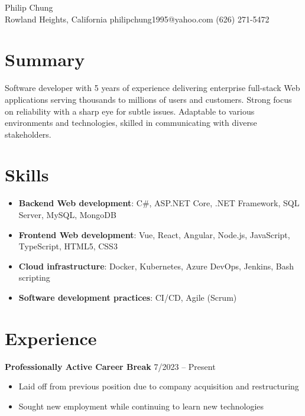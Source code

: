 \documentclass[12pt]{article}
\newcommand{\titleheader}[2]{\textbf{#1} \hfill #2}
\begin{document}
	\begin{center}
		{\headerfont\fontsize{24pt}{24pt}\selectfont Philip Chung} \\ \vspace{0.5em}
		Rowland Heights, California  philipchung1995@yahoo.com  (626) 271-5472
	\end{center}

	\section*{Summary}

	Software developer with 5 years of experience delivering enterprise full-stack Web applications serving thousands to millions of users and customers. Strong focus on reliability with a sharp eye for subtle issues. Adaptable to various environments and technologies, skilled in communicating with diverse stakeholders.

	\section*{Skills}

	\newcommand{\skillitem}[2]{\item \textbf{#1}: #2}

	\begin{itemize}[left=0.25in .. 0.25in,label={},itemindent=-0.25in]
		\skillitem{Backend Web development}{C\#, ASP.NET Core, .NET Framework, SQL Server, MySQL, MongoDB}
		\skillitem{Frontend Web development}{Vue, React, Angular, Node.js, JavaScript, TypeScript, HTML5, CSS3}
		\skillitem{Cloud infrastructure}{Docker, Kubernetes, Azure DevOps, Jenkins, Bash scripting}
		\skillitem{Software development practices}{CI/CD, Agile (Scrum)}
	\end{itemize}

	\section*{Experience}

	\titleheader{Professionally Active Career Break}{7/2023 -- Present}

	\begin{itemize}
		\item Laid off from previous position due to company acquisition and restructuring
		\item Sought new employment while continuing to learn new technologies
	\end{itemize}
\end{document}
